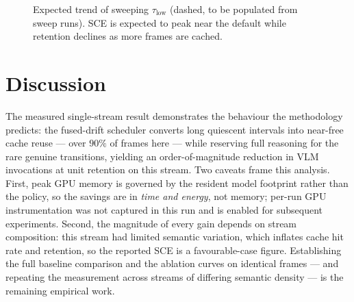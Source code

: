 \begin{figure}[htbp]
\centering
{}
\caption[Expected threshold sweep]{Expected trend of sweeping
$\tau_{\text{low}}$ (dashed, to be populated from sweep runs). SCE is expected
to peak near the default while retention declines as more frames are cached.}
\label{fig:sweep}
\end{figure}

\section{Discussion}
\label{sec:exp-discussion}

The measured single-stream result demonstrates the behaviour the methodology
predicts: the fused-drift scheduler converts long quiescent intervals into
near-free cache reuse --- over $90\%$ of frames here --- while reserving full
reasoning for the rare genuine transitions, yielding an order-of-magnitude
reduction in VLM invocations at unit retention on this stream. Two caveats
frame this analysis. First, peak GPU memory is governed by the resident model
footprint rather than the policy, so the savings are in \emph{time and
energy}, not memory; per-run GPU instrumentation was not captured in this run
and is enabled for subsequent experiments. Second, the magnitude of every gain
depends on stream composition: this stream had limited semantic variation,
which inflates cache hit rate and retention, so the reported SCE is a
favourable-case figure. Establishing the full baseline comparison and the
ablation curves on identical frames --- and repeating the measurement across
streams of differing semantic density --- is the remaining empirical work.
